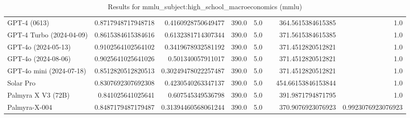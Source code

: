 \begin{table}[htp]
{\begin{tabular}{lrrrrrrr}
GPT-4 (0613) & 0.8717948717948718 & 0.4160928750649477 & 390.0 & 5.0 &  & 364.5615384615385 & 1.0 \\
GPT-4 Turbo (2024-04-09) & 0.8615384615384616 & 0.6132381714307344 & 390.0 & 5.0 &  & 371.5615384615385 & 1.0 \\
GPT-4o (2024-05-13) & 0.9102564102564102 & 0.3419678932581192 & 390.0 & 5.0 &  & 371.4512820512821 & 1.0 \\
GPT-4o (2024-08-06) & 0.9025641025641026 & 0.501340057911017 & 390.0 & 5.0 &  & 371.4512820512821 & 1.0 \\
GPT-4o mini (2024-07-18) & 0.8512820512820513 & 0.30249478022257487 & 390.0 & 5.0 &  & 371.4512820512821 & 1.0 \\
Solar Pro & 0.8307692307692308 & 0.4230540263347137 & 390.0 & 5.0 &  & 454.66153846153844 & 1.0 \\
Palmyra X V3 (72B) & 0.841025641025641 & 0.607545349536798 & 390.0 & 5.0 &  & 391.9871794871795 & 1.0 \\
Palmyra-X-004 & 0.8487179487179487 & 0.31394460568061244 & 390.0 & 5.0 &  & 370.9076923076923 & 0.9923076923076923 \\
\bottomrule
\end{tabular}}
\caption{Results for mmlu_subject:high_school_macroeconomics (mmlu)}
\label{fig:mmlu_subject:high_school_macroeconomics (mmlu)}
\end{table}